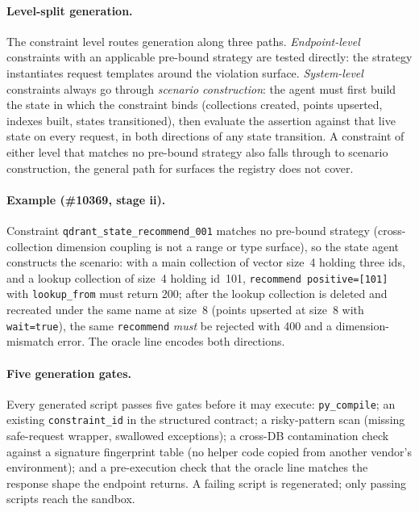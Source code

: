 \documentclass[acmsmall,screen,review,anonymous]{acmart}
\begin{document}
\paragraph{Level-split generation.}
The constraint level routes generation along three paths. \emph{Endpoint-level} constraints with an applicable pre-bound strategy are tested directly: the strategy instantiates request templates around the violation surface. \emph{System-level} constraints always go through \emph{scenario construction}: the agent must first build the state in which the constraint binds (collections created, points upserted, indexes built, states transitioned), then evaluate the assertion against that live state on every request, in both directions of any state transition. A constraint of either level that matches no pre-bound strategy also falls through to scenario construction, the general path for surfaces the registry does not cover.

\paragraph{Example (\#10369, stage ii).}
Constraint \texttt{qdrant\_state\_recommend\_001} matches no pre-bound strategy (cross-collection dimension coupling is not a range or type surface), so the state agent constructs the scenario: with a main collection of vector size~4 holding three ids, and a lookup collection of size~4 holding id~101, \texttt{recommend positive=[101]} with \texttt{lookup\_from} must return 200; after the lookup collection is deleted and recreated under the same name at size~8 (points upserted at size~8 with \texttt{wait=true}), the same \texttt{recommend} \emph{must} be rejected with 400 and a dimension-mismatch error. The oracle line encodes both directions.

\paragraph{Five generation gates.}
Every generated script passes five gates before it may execute: \texttt{py\_compile}; an existing \texttt{constraint\_id} in the structured contract; a risky-pattern scan (missing safe-request wrapper, swallowed exceptions); a cross-DB contamination check against a signature fingerprint table (no helper code copied from another vendor's environment); and a pre-execution check that the oracle line matches the response shape the endpoint returns. A failing script is regenerated; only passing scripts reach the sandbox.
\end{document}

